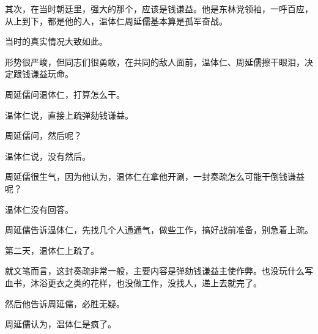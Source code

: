 \begin{multicols}{\theparacolNo}
		其次，在当时朝廷里，强大的那个，应该是钱谦益。他是东林党领袖，一呼百应，从上到下，都是他的人，温体仁周延儒基本算是孤军奋战。

		当时的真实情况大致如此。

		形势很严峻，但同志们很勇敢，在共同的敌人面前，温体仁、周延儒擦干眼泪，决定跟钱谦益玩命。

		周延儒问温体仁，打算怎么干。

		温体仁说，直接上疏弹劾钱谦益。

		周延儒问，然后呢？

		温体仁说，没有然后。

		周延儒很生气，因为他认为，温体仁在拿他开涮，一封奏疏怎么可能干倒钱谦益呢？

		温体仁没有回答。

		周延儒告诉温体仁，先找几个人通通气，做些工作，搞好战前准备，别急着上疏。

		第二天，温体仁上疏了。

		就文笔而言，这封奏疏非常一般，主要内容是弹劾钱谦益主使作弊。也没玩什么写血书，沐浴更衣之类的花样，也没做工作，没找人，递上去就完了。

		然后他告诉周延儒，必胜无疑。

		周延儒认为，温体仁是疯了。
		\ifnum{}
	\end{multicols}
\fi
\newpage
